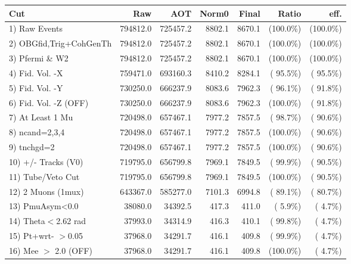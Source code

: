  \begin{table}[h!]\centering
 \begin{tabular}{||l||r|r|r|r|r|r||}
 \hline
 \hline
 Cut & Raw & AOT & Norm0 & Final & Ratio & eff.       \\
 \hline
  1) Raw Events           &     794812.0 &     725457.2 &       8802.1 &       8670.1 & (100.0\%) & (100.0\%) \\
  2) OBGfid,Trig+CohGenTh &     794812.0 &     725457.2 &       8802.1 &       8670.1 & (100.0\%) & (100.0\%) \\
  3) Pfermi \& W2         &     794812.0 &     725457.2 &       8802.1 &       8670.1 & (100.0\%) & (100.0\%) \\
  4) Fid. Vol. -X         &     759471.0 &     693160.3 &       8410.2 &       8284.1 & ( 95.5\%) & ( 95.5\%) \\
  5) Fid. Vol. -Y         &     730250.0 &     666237.9 &       8083.6 &       7962.3 & ( 96.1\%) & ( 91.8\%) \\
  6) Fid. Vol. -Z (OFF)   &     730250.0 &     666237.9 &       8083.6 &       7962.3 & (100.0\%) & ( 91.8\%) \\
  7) At Least 1 Mu        &     720498.0 &     657467.1 &       7977.2 &       7857.5 & ( 98.7\%) & ( 90.6\%) \\
  8) ncand=2,3,4          &     720498.0 &     657467.1 &       7977.2 &       7857.5 & (100.0\%) & ( 90.6\%) \\
  9) tnchgd=2             &     720498.0 &     657467.1 &       7977.2 &       7857.5 & (100.0\%) & ( 90.6\%) \\
 10) +/- Tracks (V0)      &     719795.0 &     656799.8 &       7969.1 &       7849.5 & ( 99.9\%) & ( 90.5\%) \\
 11) Tube/Veto Cut        &     719795.0 &     656799.8 &       7969.1 &       7849.5 & (100.0\%) & ( 90.5\%) \\
 12) 2 Muons (1mux)       &     643367.0 &     585277.0 &       7101.3 &       6994.8 & ( 89.1\%) & ( 80.7\%) \\
 13) PmuAsym<0.0          &      38080.0 &      34392.5 &        417.3 &        411.0 & (  5.9\%) & (  4.7\%) \\
 14) Theta$<$2.62 rad     &      37993.0 &      34314.9 &        416.3 &        410.1 & ( 99.8\%) & (  4.7\%) \\
 15) Pt+wrt- $>$0.05      &      37968.0 &      34291.7 &        416.1 &        409.8 & ( 99.9\%) & (  4.7\%) \\
 16) Mee $>$ 2.0  (OFF)   &      37968.0 &      34291.7 &        416.1 &        409.8 & (100.0\%) & (  4.7\%) \\

\end{tabular}
\end{table}
